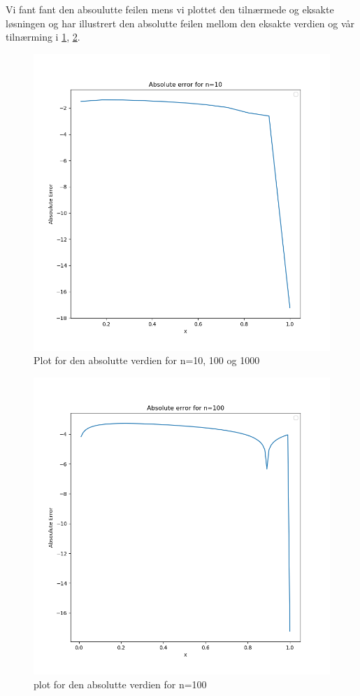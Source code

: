 \documentclass[english,notitlepage]{revtex4-1}  %
\begin{document}
Vi fant fant den absoulutte feilen mens vi plottet den tilnærmede og eksakte løsningen og har illustrert den absolutte feilen mellom den eksakte verdien og vår tilnærming i \ref{abserrn10}, \ref{abserrn100}.
\begin{figure}
	\centering
	\label{abserrn10}
	\includegraphics[scale=0.5]{abserrn10.png}
	\caption{Plot for den absolutte verdien for n=10, 100 og 1000}
\end{figure}
\begin{figure}
	\centering
	\label{abserrn100}
	\includegraphics[scale=0.5]{abserrn100.png}
	\caption{plot for den absolutte verdien for n=100}
\end{figure}
\end{document}
